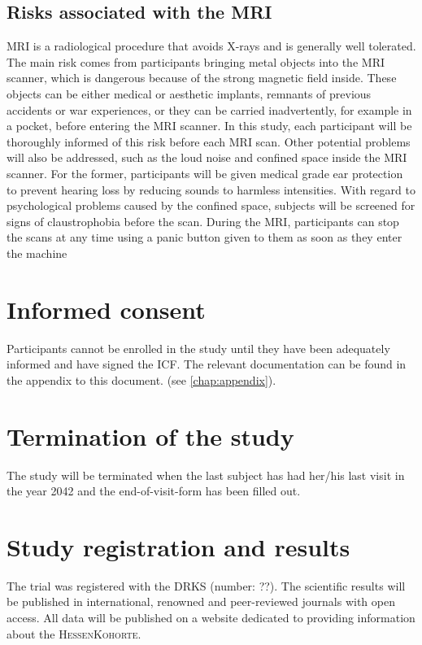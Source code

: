 
\subsection{Risks associated with the \ac{MRI}}
\ac{MRI} is a radiological procedure that avoids X-rays and is generally well tolerated. The main risk comes from participants bringing metal objects into the \ac{MRI} scanner, which is dangerous because of the strong magnetic field inside. These objects can be either medical or aesthetic implants, remnants of previous accidents or war experiences, or they can be carried inadvertently, for example in a pocket, before entering the \ac{MRI} scanner. In this study, each participant will be thoroughly informed of this risk before each \ac{MRI} scan. Other potential problems will also be addressed, such as the loud noise and confined space inside the \ac{MRI} scanner. For the former, participants will be given medical grade ear protection to prevent hearing loss by reducing sounds to harmless intensities. With regard to psychological problems caused by the confined space, subjects will be screened for signs of claustrophobia before the scan. During the \ac{MRI}, participants can stop the scans at any time using a panic button given to them as soon as they enter the machine

\section{Informed consent}
Participants cannot be enrolled in the study until they have been adequately informed and have signed the \ac{ICF}. The relevant documentation can be found in the appendix to this document. (see \ref{chap:appendix}).

\section{Termination of the study}
The study will be terminated when the last subject has had her/his last visit in the year 2042 and the end-of-visit-form has been filled out.

\section{Study registration and results}
The trial was registered with the \ac{DRKS} (number: ??). The scientific results will be published in international, renowned and peer-reviewed journals with open access. All data will be published on a website dedicated to providing information about the \textsc{HessenKohorte}.


